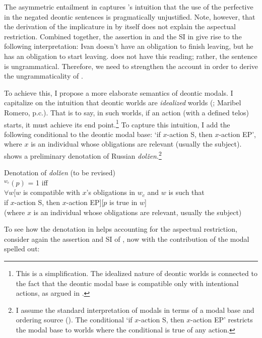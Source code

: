 \documentclass[output=paper,
modfonts,
newtxmath,colorlinks,citecolor=brown
]{langscibook}
\begin{document}
\noindent The asymmetric entailment in  captures \citeauthor{rap85}'s intuition that the use of the perfective in the negated deontic sentences is pragmatically unjustified. Note, however, that the derivation of the implicature in  by itself does not explain the aspectual restriction. Combined together, the assertion in  and the SI in  give rise to the following interpretation: Ivan doesn't have an obligation to finish leaving, but he has an obligation to start leaving.  does not have this reading; rather, the sentence is ungrammatical. Therefore, we need to strengthen the account in order to derive the ungrammaticality of .

To achieve this, I propose a more elaborate semantics of deontic modals. I capitalize on the intuition that deontic worlds are \textit{idealized} worlds (\citealt{kra12}; Maribel Romero, p.c.). That is to say, in such worlds, if an action (with a defined telos) starts, it must achieve its end point.\footnote{This is a simplification. The idealized nature of deontic worlds is connected to the fact that the deontic modal base is compatible only with intentional actions, as argued in \citet{gon18a}.}
To capture this intuition, I add the following conditional to the deontic modal base: `if $x$-action S, then $x$-action EP', where $x$ is an individual whose obligations are relevant (usually the subject).  shows a preliminary denotation of Russian \textit{dolžen}.\footnote{I assume the standard interpretation of modals in terms of a modal base and ordering source (\citealt{kra91}). The conditional `if $x$-action S, then $x$-action EP' restricts the modal base to worlds where the conditional is true of any action.
}

\ea Denotation of \textit{dolžen} (to be revised) \\
	$^{w_c}(p)$ = 1 iff \\
    $\forall w$[$w$ is compatible with $x$'s obligations in $w_c$ and $w$ is such that \\
    if $x$-action S, then $x$-action EP][$p$ is true in $w$] \\
    (where $x$ is an individual whose obligations are relevant, usually the subject) \label{sxdolzhen}
        \z
    
\noindent To see how the denotation in  helps accounting for the aspectual restriction, consider again the assertion and SI of , now with the contribution of the modal spelled out:
\end{document}
